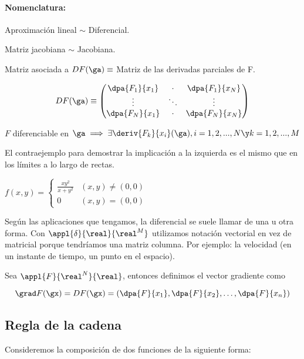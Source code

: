 \paragraph{Nomenclatura: }
Aproximación lineal $\sim$ Diferencial.

Matriz jacobiana $\sim$ Jacobiana.

\begin{defn}
 Matriz asociada a $DF(\ga) \equiv $ Matriz de las derivadas parciales de F.

 $$DF(\ga) \equiv \begin{pmatrix}
                \dpa{F_1}{x_1} & \cdot & \dpa{F_1}{x_N}\\
                \vdots& \ddots & \vdots\\
                \dpa{F_N}{x_1} & \cdot & \dpa{F_N}{x_N}
                \end{pmatrix}
$$
\end{defn}

\begin{theorem}
 $F$ diferenciable en $\ga \implies \exists \deriv{F_k}{x_i}(\ga), i=1,2,...,N \y k = 1,2,...,M$
\end{theorem}

El contraejemplo para demostrar la implicación a la izquierda es el mismo que en los límites a lo largo de rectas.

$f(x,y) = \left\{ \begin{matrix}
\displaystyle\frac{xy^2}{x+y^2} & (x,y) \neq (0,0) \\
0 & (x,y)=(0,0)

          \end{matrix}\right.
$

Según las aplicaciones que tengamos, la diferencial se suele llamar de una u otra forma. Con $\appl{\delta}{\real}{\real^M}$ utilizamos notación vectorial en vez de matricial porque tendríamos una matriz columna. Por ejemplo: la velocidad (en un instante de tiempo, un punto en el espacio).

\begin{defn}[Gradiente] Sea $\appl{F}{\real^N}{\real}$, entonces definimos el vector gradiente como

\[ \grad F(\gx) = DF(\gx) = \left(\dpa{F}{x_1}, \dpa{F}{x_2},\dotsc, \dpa{F}{x_n}\right) \]
\end{defn}


\subsection{Regla de la cadena}
Consideremos la composición de dos funciones de la siguiente forma:

